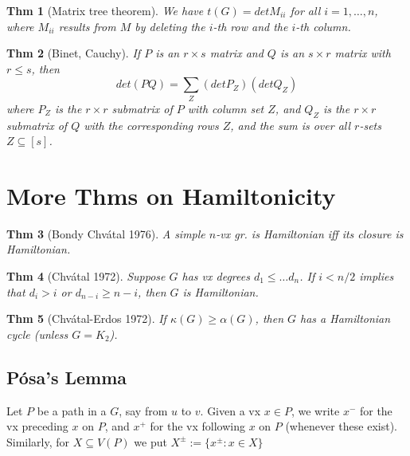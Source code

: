 \documentclass[11pt, fleqn, a4paper, landscape]{article}
\theoremstyle{plain} %
\newtheorem{thm}{Thm}
\theoremstyle{remark} %
\theoremstyle{definition} %
\newtheorem{defi}[thm]{Def}
\begin{document}
\begin{multicols}{5}
\begin{thm}[Matrix tree theorem]
We have $t(G) = det M_{ii}$ for all $i = 1, \dots , n$, where $M_{ii}$ results
from $M$ by deleting the $i$-th row and the $i$-th column.
\end{thm}

\begin{thm}[Binet,  Cauchy]
If $P$ is an $r \times s$ matrix and $Q$ is an $s \times r$ matrix with $r\le s$, then \[det(PQ) =\sum_Z (det P_Z)(detQ_Z)\]
where $P_Z$ is the $r\times r$ submatrix of $P$ with column set $Z$, and $Q_Z$ is the $r\times r$ submatrix of $Q$ with the corresponding rows $Z$, and the sum is over all $r$-sets $Z \subseteq [s]$.
\end{thm}

\addtocounter{subsection}{1}

\section{More Thms on Hamiltonicity}
\addtocounter{thm}{1}
\begin{thm}[Bondy Chvátal 1976]
A simple $n$-vx gr. is Hamiltonian iff its closure is Hamiltonian.
\end{thm}
\begin{thm}[Chvátal 1972]
Suppose $G$ has vx degrees $d_1\le \dots d_n$. If $i < n/2$ implies
that $d_i > i$ or $d_{n-i} \ge n - i$, then $G$ is Hamiltonian.
\end{thm}

\begin{thm}[Chvátal-Erdos 1972]
If $\kappa (G)\ge\alpha(G)$, then $G$ has a Hamiltonian cycle (unless
$G = K_2$).
\end{thm}

\subsection{Pósa’s Lemma}
Let $P$ be a path in a $G$, say from $u$ to $v$. Given a vx $x \in P$, we write $x^-$ for the vx preceding $x$ on $P$, and $x^+$ for the vx following $x$ on $P$ (whenever these exist). Similarly, for $X \subseteq V (P)$ we put $X^\pm:=\{x^\pm:x\in X\}$


\end{multicols}
\end{document}
